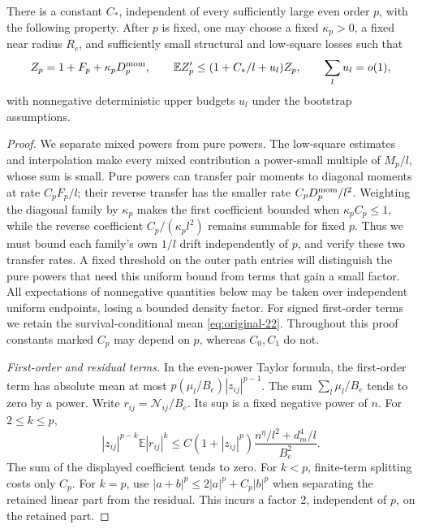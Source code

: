 \begin{lemma}\label{lem:early-high-moments}
There is a constant \(C_*\), independent of every sufficiently
large even order \(p\), with the following property. After \(p\)
is fixed, one may choose a fixed \(\kappa_p>0\), a fixed near
radius \(R_c\), and sufficiently small structural and low-square
losses such that
\begin{equation}
 Z_p=1+F_p+\kappa_pD_p^{\rm mom},\qquad
 \mathbb E Z_p'\le(1+C_*/l+u_l)Z_p,
 \qquad \sum_lu_l=o(1),
\label{eq:original-33}
\end{equation}
with nonnegative deterministic upper budgets \(u_l\) under the
bootstrap assumptions.
\end{lemma}
\begin{proof}
We separate mixed powers from pure powers. The low-square estimates and
interpolation make every mixed contribution a power-small multiple of
\(M_p/l\), whose sum is small. Pure powers can transfer pair moments
to diagonal moments at rate \(C_pF_p/l\); their reverse transfer has
the smaller rate \(C_pD_p^{\rm mom}/l^2\). Weighting the diagonal
family by \(\kappa_p\) makes the first coefficient bounded when
\(\kappa_p C_p\le1\), while the reverse coefficient
\(C_p/(\kappa_p l^2)\) remains summable for fixed \(p\).
Thus we must bound each family's own \(1/l\) drift independently of
\(p\), and verify these two transfer rates. A fixed threshold on the
outer path entries will distinguish the pure powers that need this
uniform bound from terms that gain a small factor.
All expectations of nonnegative quantities below may be taken over
independent uniform endpoints, losing a bounded density factor.
For signed first-order terms we retain the survival-conditional
mean \eqref{eq:original-22}. Throughout this proof constants marked
\(C_p\) may depend on \(p\), whereas \(C_0,C_1\) do not.

\par\smallskip\noindent\textit{First-order and residual terms.}\quad
In the even-power Taylor formula, the first-order term has absolute
mean at most \(p(\mu_l/B_e)|z_{ij}|^{p-1}\).
The sum \(\sum_l\mu_l/B_e\) tends to zero by a power.
Write \(r_{ij}=\mathcal N_{ij}/B_e\). Its sup is a fixed
negative power of \(n\). For \(2\le k\le p\),
\[
 |z_{ij}|^{p-k}\mathbb E|r_{ij}|^k
 \le C(1+|z_{ij}|^p)
       \frac{n^\eta/l^2+d_m^4/l}{B_e^2}.
\]
The sum of the displayed coefficient tends to zero.
For \(k<p\), finite-term splitting costs only \(C_p\).
For \(k=p\), use
\(|a+b|^p\le2|a|^p+C_p|b|^p\) when separating the retained
linear part from the residual. This incurs a factor 2, independent
of \(p\), on the retained part.


\end{proof}
